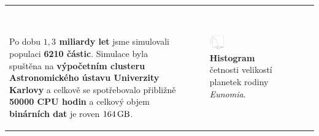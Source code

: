 \documentclass{beamer}
\newlength{\vyska}
\newlength{\vyskaB}
\newlength{\main}
\begin{document}
\begin{frame}
\begin{columns}[t]
\begin{column}{\main}
\begin{tcolorbox}[title=Simulace orbitálního vývoje\phantom{Úy},height=0.75\vyskaB]
\begin{tabularx}{\textwidth}{Xp{}}
\

	Po dobu \textbf{$1,3$ miliardy let} jsme simulovali populaci \textbf{6210 částic}. Simulace byla spuštěna na \textbf{výpočetním clusteru Astronomického ústavu Univerzity Karlovy} a celkově se spotřebovalo přibližně \textbf{50000 CPU hodin} a celkový objem \textbf{binárních dat} je roven $164\,{\rm GB}$.

		&

		\vspace{-1cm}
		\begin{figure}
			\centering
			\captionsetup{width=0.2\textwidth}
			\includegraphics[width=0.2\textwidth]{../obr/size_distribution}
			\caption{\textbf{Histogram} četnosti velikostí planetek rodiny \textit{Eunomia}.} 

			\label{fig:sfd}
		\end{figure}
	\end{tabularx}


\end{tcolorbox}
\end{column}
\end{columns}
\end{frame}
\end{document}
